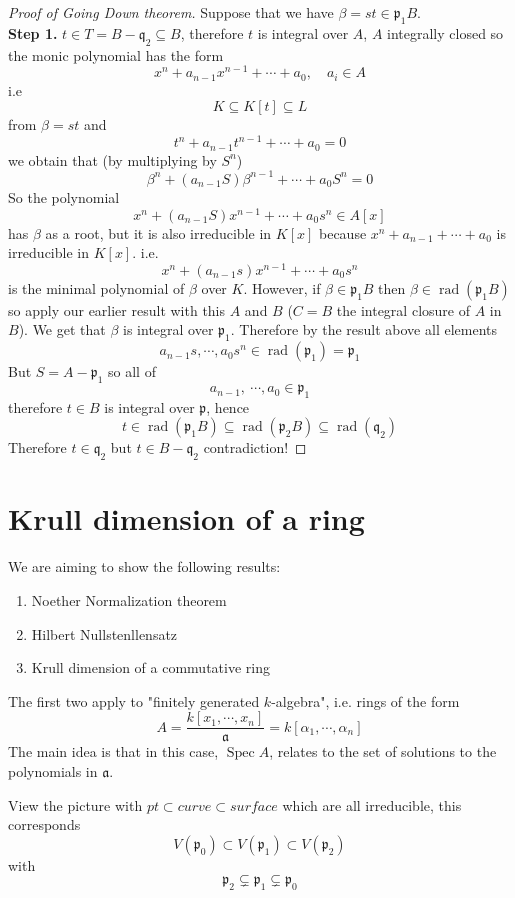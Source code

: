 \documentclass[11pt,a4paper]{article}
\theoremstyle{definition}
\theoremstyle{plain}
\theoremstyle{remark}
\newcommand{\Spec}{\operatorname{Spec}}
\newcommand{\rad}{\operatorname{rad}}
\begin{document}
\begin{proof}[Proof of Going Down theorem]
    Suppose that we have $\beta = st \in \mathfrak{p}_1B$. \\
    \textbf{Step 1.} $t \in T = B- \mathfrak{q}_2 \subseteq B$, therefore $t$ is integral over $A$, $A$ integrally closed 
    so the monic polynomial has the form 
    $$x^n + a_{n-1} x^{n-1} + \cdots + a_0, \quad a_i \in A$$
    i.e 
    $$K \subseteq K[t] \subseteq L$$
    from $\beta = st$ and 
    $$t^n + a_{n-1} t^{n-1} + \cdots + a_0 = 0$$
    we obtain that (by multiplying by $S^n$)
    $$\beta^n + (a_{n-1} S)\beta^{n-1} + \cdots + a_0 S^n = 0$$
    So the polynomial 
    $$x^n + (a_{n-1} S) x^{n-1} + \cdots + a_0 s^n \in A[x]$$
    has $\beta$ as a root, but it is also irreducible in $K[x]$ because
    $x^n + a_{n-1} + \cdots + a_0$ is irreducible in $K[x]$. i.e. 
    $$x^n + (a_{n-1} s) x^{n-1} + \cdots + a_0 s^n$$
    is the minimal polynomial of $\beta$ over $K$. However, if $\beta \in \mathfrak{p}_1B$ then
    $\beta \in \rad (\mathfrak{p}_1 B)$ so apply our earlier result with this $A$ and $B$ ($C = B$ the integral closure of $A$ in $B$). 
    We get that $\beta$ is integral over $\mathfrak{p}_1$. Therefore by the result above all elements 
    $$a_{n-1} s, \cdots, a_0 s^n \in \rad(\mathfrak{p}_1) = \mathfrak{p}_1$$
    But $S = A -\mathfrak{p}_1$ so all of 
    $$a_{n-1}, \ \cdots, a_0 \in \mathfrak{p}_1$$
    therefore $t \in B$ is integral over $\mathfrak{p}$, hence 
    $$t \in \rad (\mathfrak{p}_1B) \subseteq \rad(\mathfrak{p}_2 B) \subseteq \rad (\mathfrak{q}_2)$$
    Therefore $t \in \mathfrak{q}_2$ but $t \in B- \mathfrak{q}_2$ contradiction!
\end{proof}
\section{Krull dimension of a ring}
We are aiming to show the following results: 
\begin{enumerate}
    \item Noether Normalization theorem
    \item Hilbert Nullstenllensatz
    \item Krull dimension of a commutative ring
\end{enumerate}
The first two apply to "finitely generated $k$-algebra", i.e. rings of the form 
$$A = \frac{k[x_1, \cdots, x_n]}{\mathfrak{a}} = k[\alpha_1, \cdots, \alpha_n]$$
The main idea is that in this case, $\Spec A$, relates to the set of solutions to the polynomials in $\mathfrak{a}$. 

View the picture with $pt \subset curve \subset surface$ which are all irreducible, this corresponds 
$$V(\mathfrak{p}_0) \subset V(\mathfrak{p}_1) \subset V(\mathfrak{p}_2)$$
with 
$$\mathfrak{p}_2 \subsetneq \mathfrak{p}_1 \subsetneq \mathfrak{p}_0$$
\end{document}
